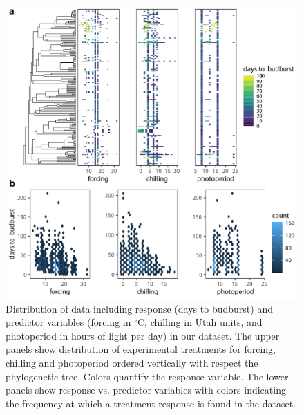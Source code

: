 \documentclass[11pt]{article}
\begin{document}
\begin{figure}
  \begin{center}
  \includegraphics[width=16cm]{../../analyses/phylogeny/figures/rawplots_2Ds.pdf} %
  \caption{Distribution of data including response (days to budburst) and predictor variables (forcing in $^\circ$C, chilling in Utah units, and photoperiod in hours of light per day) in our dataset. The upper panels show distribution of experimental treatments for forcing, chilling and photoperiod ordered vertically with respect the phylogenetic tree. Colors quantify the response variable. The lower panels show response vs. predictor variables with colors indicating the frequency at which a treatment-response is found in the dataset.}
  \label{fig:raw2ddata}
  \end{center}
\end{figure}
\clearpage
\end{document}
